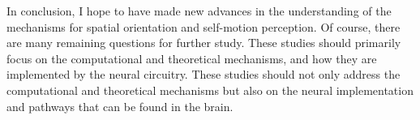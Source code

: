In conclusion, I hope to have made new advances in the understanding of the mechanisms for spatial orientation and self-motion perception. Of course, there are many remaining questions for further study. These studies should primarily focus on the computational and theoretical mechanisms, and how they are implemented by the neural circuitry. These studies should not only address the computational and theoretical mechanisms but also on the neural implementation and pathways that can be found in the brain.

 